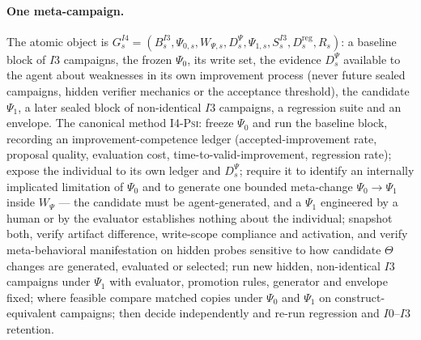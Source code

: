 \documentclass[11pt]{article}
\theoremstyle{definition}
\begin{document}
\paragraph{One meta-campaign.} The atomic object is $G^{I4}_s = (B^{I3}_s, \Psi_{0,s}, W_{\Psi,s}, D^{\Psi}_s, \Psi_{1,s}, S^{I3}_s, D^{\mathrm{reg}}_s, R_s)$: a baseline block of $I3$ campaigns, the frozen $\Psi_0$, its write set, the evidence $D^{\Psi}_s$ available to the agent about weaknesses in its own improvement process (never future sealed campaigns, hidden verifier mechanics or the acceptance threshold), the candidate $\Psi_1$, a later sealed block of non-identical $I3$ campaigns, a regression suite and an envelope. The canonical method \textsc{I4-Psi}: freeze $\Psi_0$ and run the baseline block, recording an improvement-competence ledger (accepted-improvement rate, proposal quality, evaluation cost, time-to-valid-improvement, regression rate); expose the individual to its own ledger and $D^{\Psi}_s$; require it to identify an internally implicated limitation of $\Psi_0$ and to generate one bounded meta-change $\Psi_0 \to \Psi_1$ inside $W_\Psi$ --- the candidate must be agent-generated, and a $\Psi_1$ engineered by a human or by the evaluator establishes nothing about the individual; snapshot both, verify artifact difference, write-scope compliance and activation, and verify meta-behavioral manifestation on hidden probes sensitive to how candidate $\Theta$ changes are generated, evaluated or selected; run new hidden, non-identical $I3$ campaigns under $\Psi_1$ with evaluator, promotion rules, generator and envelope fixed; where feasible compare matched copies under $\Psi_0$ and $\Psi_1$ on construct-equivalent campaigns; then decide independently and re-run regression and $I0$--$I3$ retention.
\end{document}
